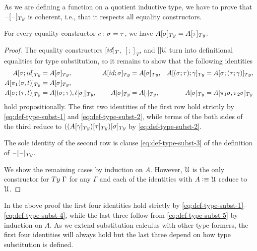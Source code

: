 \documentclass[a4paper,UKenglish,numberwithinsect,cleveref,thm-restate]{lipics-v2021}
\newcommand{\danger}{\marginpar[\hfill\dbend]{\dbend\hfill}}
\newcommand{\LT}[2][]{\todo[inline,author={L-T},caption={},color={pink},#1]{#2}}
\newcommand{\Fredrik}[2][]{\todo[inline,author={Fred},caption={},#1]{#2}}
\begin{document}
As we are defining a function on a quotient inductive type, we have to prove that $\subTy{\blank}{\blank}$ is coherent, i.e., that it respects all equality constructors.
\begin{proposition}\label{prop:coherence-1}
  For every equality constructor $\cc : \sigma = \tau$, we have $\subTy{A}{\sigma} = \subTy{A}{\tau}$.
  \danger
\end{proposition}
\begin{proof}
  The equality constructors $[\idS]_T$, $[;]_T$, and $[]\mathcal{U}$ turn into definitional equalities for type substitution, so it remains to show that the following identities
  \begin{align*}
    \subTy{A}{\sigma;\idS}          & = \subTy{A}{\sigma},
                                    & \subTy{A}{\idS;\sigma}          & = \subTy{A}{\sigma},
                                     & \subTy{A}{(\sigma;\tau);\gamma} & = \subTy{A}{\sigma; (\tau; \gamma)}, \\
    \subTy{A}{\pi_1(\sigma, t)}      & = \subTy{A}{\sigma}, \\
    \subTy{A}{\sigma; (\tau, t)}    & = \subTy{A}{(\sigma;\tau), \sub{t}{\sigma}},
                                     & \subTy{A}{\sigma}               & = \subTy{A}{\emptyctx},
                                     & \subTy{A}{\sigma}               & = \subTy{A}{\pi_1\sigma, \pi_2\sigma}
  \end{align*}
  hold propositionally.
  The first two identities of the first row hold strictly by \eqref{eq:def-type-subst-1} and \eqref{eq:def-type-subst-2}, while terms of the both sides of the third reduce to $\subTy{(\subTy{(\subTy{A}{\gamma})}{\tau})}{\sigma}$ by \eqref{eq:def-type-subst-2}.

  The sole identity of the second row is clause \eqref{eq:def-type-subst-3} of the definition of $\subTy{\blank}{\blank}$.

  We show the remaining cases by induction on $A$.
  However, $\mathcal{U}$ is the only constructor for $\Ty\;\Gamma$ for any $\Gamma$ and each of the identities with $A \vcentcolon\equiv \mathcal{U}$ reduce to $\mathcal{U}$.
\end{proof}
\begin{remark}\label{re:coherence-proof}
  In the above proof the first four identities hold strictly by \eqref{eq:def-type-subst-1}--\eqref{eq:def-type-subst-4}, while the last three follow from \eqref{eq:def-type-subst-5} by induction on $A$.
  As we extend substitution calculus with other type formers, the first four identities will always hold but the last three depend on how type substitution is defined.
\end{remark}
\end{document}
